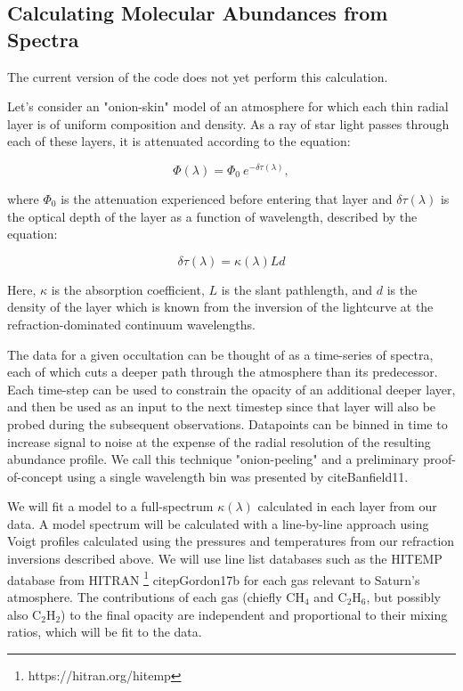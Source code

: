\documentclass[12pt]{article}
\begin{document}
\subsection{Calculating Molecular Abundances from Spectra}

The current version of the code does not yet perform this calculation.

Let's consider an "onion-skin" model of an atmosphere for which each thin
radial layer is of uniform composition and density. As a ray of star light
passes through each of these layers, it is attenuated according to the
equation:

\begin{equation}
\Phi(\lambda) = \Phi_0\ e^{-\delta\tau(\lambda)},
\label{eq:abs_flux}
\end{equation}

\noindent where $\Phi_0$ is the attenuation experienced before entering that layer
and $\delta\tau(\lambda)$ is the optical depth of the layer as a function of
wavelength, described by the equation:

\begin{equation}
\delta\tau(\lambda) = \kappa(\lambda) L d
\label{eq:optical_depth}
\end{equation}

\noindent Here, $\kappa$ is the absorption coefficient, $L$ is the slant
pathlength, and $d$ is the density of the layer which is known from the
inversion of the lightcurve at the refraction-dominated continuum wavelengths.

The data for a given occultation can be thought of as a time-series of spectra,
each of which cuts a deeper path through the atmosphere than its predecessor.
Each time-step can be used to constrain the opacity of an additional deeper
layer, and then be used as an input to the next timestep since that layer will
also be probed during the subsequent observations. Datapoints can be binned in
time to increase signal to noise at the expense of the radial resolution of the
resulting abundance profile. We call this technique "onion-peeling" and a
preliminary proof-of-concept using a single wavelength bin was presented by
cite{Banfield11}.

We will fit a model to a full-spectrum $\kappa(\lambda)$ calculated in each
layer from our data. A model spectrum will be calculated with a line-by-line
approach using Voigt profiles calculated using the pressures and temperatures
from our refraction inversions described above.  We will use line list
databases such as the HITEMP database from HITRAN
\footnote{https://hitran.org/hitemp} citep{Gordon17b} for each gas relevant to
Saturn's atmosphere. The contributions of each gas (chiefly CH$_4$ and
C$_2$H$_6$, but possibly also C$_2$H$_2$) to the final opacity are independent
and proportional to their mixing ratios, which will be fit to the data.
\end{document}
